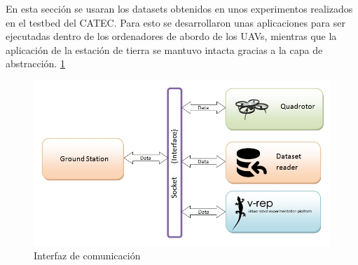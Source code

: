 
	En esta secci\'on se usaran los datasets obtenidos en unos experimentos realizados en el testbed del CATEC. Para esto se desarrollaron unas aplicaciones para ser ejecutadas dentro de los ordenadores de abordo de los UAVs, mientras que la aplicaci\'on de la estaci\'on de tierra se mantuvo intacta gracias a la capa de abstracci\'on. \ref{fig:Interfaces}
	
	\begin{figure}[th]
		\centering
		\includegraphics[width=\linewidth]{../Images/c4/Interfaces}
		\caption{Interfaz de comunicaci\'on}
		\label{fig:Interfaces}
	\end{figure}

	